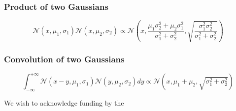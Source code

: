 \documentclass[%
 reprint,
 amsmath,amssymb,
 aps,
]{revtex4-1}
\begin{document}
\subsubsection{Product of two Gaussians}
\begin{equation}
\mathcal{N}(x,\mu_{1},\sigma_{1})\mathcal{N}(x,\mu_{2},\sigma_{2}) 
\propto \mathcal{N}\left(x,\frac{\mu_{1}\sigma_{2}^{2}+\mu_{2}\sigma_{1}^{2}}{\sigma_{1}^2+\sigma_{2}^2},\sqrt{\frac{\sigma_{1}^2\sigma_{2}^2}{\sigma_{1}^2+\sigma_{2}^2}}\right)
\end{equation}
\subsubsection{Convolution of two Gaussians}
\begin{equation}
\int_{-\infty}^{+\infty}\mathcal{N}(x-y,\mu_{1},\sigma_{1})\mathcal{N}(y,\mu_{2},\sigma_{2})dy
	\propto\mathcal{N}\left(x,\mu_{1}+\mu_{2},\sqrt{\sigma_{1}^2+\sigma_{2}^2}\right)
\end{equation}
\begin{acknowledgments}
We wish to acknowledge funding by the 
\end{acknowledgments}
\end{document}
